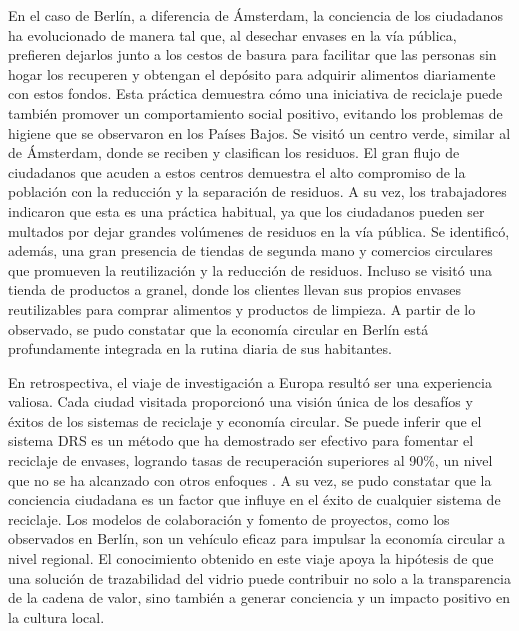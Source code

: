En el caso de Berlín, a diferencia de Ámsterdam, la conciencia de los ciudadanos ha evolucionado de manera tal que, al desechar envases en la vía pública, prefieren dejarlos junto a los cestos de basura para facilitar que las personas sin hogar los recuperen y obtengan el depósito para adquirir alimentos diariamente con estos fondos. Esta práctica demuestra cómo una iniciativa de reciclaje puede también promover un comportamiento social positivo, evitando los problemas de higiene que se observaron en los Países Bajos. Se visitó un centro verde, similar al de Ámsterdam, donde se reciben y clasifican los residuos. El gran flujo de ciudadanos que acuden a estos centros demuestra el alto compromiso de la población con la reducción y la separación de residuos. A su vez, los trabajadores indicaron que esta es una práctica habitual, ya que los ciudadanos pueden ser multados por dejar grandes volúmenes de residuos en la vía pública. Se identificó, además, una gran presencia de tiendas de segunda mano y comercios circulares que promueven la reutilización y la reducción de residuos. Incluso se visitó una tienda de productos a granel, donde los clientes llevan sus propios envases reutilizables para comprar alimentos y productos de limpieza. A partir de lo observado, se pudo constatar que la economía circular en Berlín está profundamente integrada en la rutina diaria de sus habitantes.

En retrospectiva, el viaje de investigación a Europa resultó ser una experiencia valiosa. Cada ciudad visitada proporcionó una visión única de los desafíos y éxitos de los sistemas de reciclaje y economía circular. Se puede inferir que el sistema DRS es un método que ha demostrado ser efectivo para fomentar el reciclaje de envases, logrando tasas de recuperación superiores al 90\%, un nivel que no se ha alcanzado con otros enfoques \cite{pending}. A su vez, se pudo constatar que la conciencia ciudadana es un factor que influye en el éxito de cualquier sistema de reciclaje. Los modelos de colaboración y fomento de proyectos, como los observados en Berlín, son un vehículo eficaz para impulsar la economía circular a nivel regional. El conocimiento obtenido en este viaje apoya la hipótesis de que una solución de trazabilidad del vidrio puede contribuir no solo a la transparencia de la cadena de valor, sino también a generar conciencia y un impacto positivo en la cultura local.

